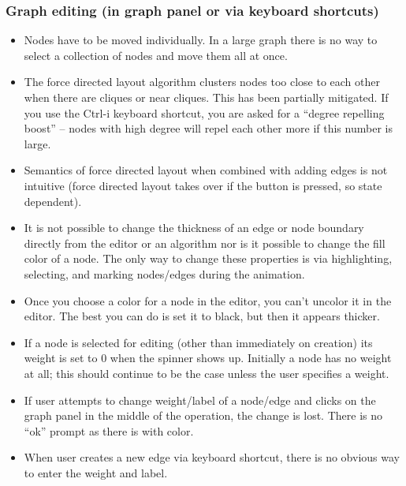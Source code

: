 \subsubsection*{Graph editing (in graph panel or via keyboard shortcuts)}

\begin{itemize}

\item Nodes have to be moved individually. In a large graph there is no way
  to select a collection of nodes and move them all at once.

\item The force directed layout algorithm clusters nodes too close to each
  other when there are cliques or near cliques. This has been partially
  mitigated. If you use the \textsf{Ctrl-i} keyboard shortcut, you are asked
  for a ``degree repelling boost'' -- nodes with high degree will repel each
  other more if this number is large.

\item Semantics of force directed layout when combined with adding edges is
  not intuitive (force directed layout takes over if the button is pressed,
  so state dependent).

\item It is not possible to change the thickness of an edge or node boundary
  directly from the editor or an algorithm nor is it possible to change the
  fill color of a node.  The only way to change these properties is via
  highlighting, selecting, and marking nodes/edges during the animation.

\item Once you choose a color for a node in the editor, you can't uncolor it in
  the editor. The best you can do is set it to black, but then it appears
  thicker.

\item If a node is selected for editing (other than immediately on creation)
  its weight is set to 0 when the spinner shows up.  Initially a node has no
  weight at all; this should continue to be the case unless the user
  specifies a weight.

\item If user attempts to change weight/label of a node/edge and clicks on
  the graph panel in the middle of the operation, the change is lost.
  There
  is no ``ok'' prompt as there is with color.

\item When user creates a new edge via keyboard shortcut, there is no obvious
  way to enter the weight and label.

\end{itemize}

